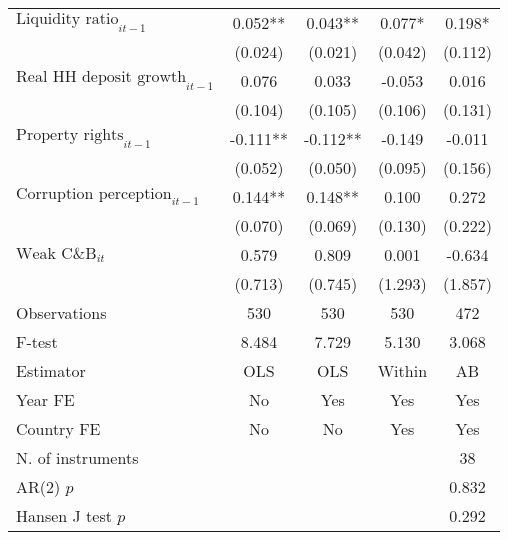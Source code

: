 \begin{longtable}{m{8cm}*{4}{c}}
$\text{Liquidity ratio}_{it-1}$&       0.052** &       0.043** &       0.077*  &       0.198*  \\
                    &     (0.024)   &     (0.021)   &     (0.042)   &     (0.112)   \\
$\text{Real HH deposit growth}_{it-1}$&       0.076   &       0.033   &      -0.053   &       0.016   \\
                    &     (0.104)   &     (0.105)   &     (0.106)   &     (0.131)   \\
$\text{Property rights}_{it-1}$&      -0.111** &      -0.112** &      -0.149   &      -0.011   \\
                    &     (0.052)   &     (0.050)   &     (0.095)   &     (0.156)   \\
$\text{Corruption perception}_{it-1}$&       0.144** &       0.148** &       0.100   &       0.272   \\
                    &     (0.070)   &     (0.069)   &     (0.130)   &     (0.222)   \\
$\text{Weak C\&B}_{it}$&       0.579   &       0.809   &       0.001   &      -0.634   \\
                    &     (0.713)   &     (0.745)   &     (1.293)   &     (1.857)   \\
\midrule
Observations        &         530   &         530   &         530   &         472   \\
F-test              &       8.484   &       7.729   &       5.130   &       3.068   \\
Estimator           &         OLS   &         OLS   &      Within   &          AB   \\
Year FE             &          No   &         Yes   &         Yes   &         Yes   \\
Country FE          &          No   &          No   &         Yes   &         Yes   \\
N. of instruments   &               &               &               &          38   \\
AR(2) \(p\)         &               &               &               &       0.832   \\
Hansen J test \(p\) &               &               &               &       0.292   \\

\end{longtable}
